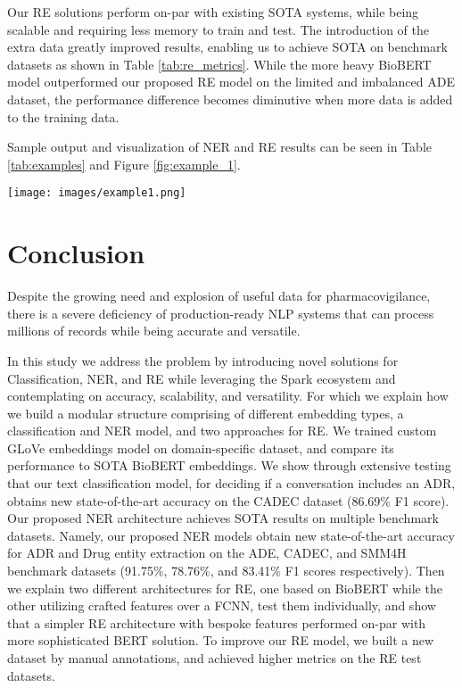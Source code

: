 \documentclass[letterpaper]{article}
\begin{document}
Our RE solutions perform on-par with existing SOTA systems, while being scalable and requiring less memory to train and test. The introduction of the extra data greatly improved results, enabling us to achieve SOTA on benchmark datasets as shown in Table \ref{tab:re_metrics}. While the more heavy BioBERT model outperformed our proposed RE model on the limited and imbalanced ADE dataset, the performance difference becomes diminutive when more data is added to the training data.

Sample output and visualization of NER and RE results can be seen in Table \ref{tab:examples} and Figure \ref{fig:example_1}.

\begin{figure*}[h!]
  \texttt{[image: images/example1.png]}
  \caption{Visualization of Entity Recognition and Relation Extraction results on a sample text. 1 denotes positive relation and 0 denotes negative relation (not related).}
  \label{fig:example_1}
\end{figure*}

\section{Conclusion}
Despite the growing need and explosion of useful data for pharmacovigilance, there is a severe deficiency of production-ready NLP systems that can process millions of records while being accurate and versatile.

In this study we address the problem by introducing novel solutions for Classification, NER, and RE while leveraging the Spark ecosystem and contemplating on accuracy, scalability, and versatility. For which we explain how we build a modular structure comprising of different embedding types, a classification and NER model, and two approaches for RE. We trained custom GLoVe embeddings model on domain-specific dataset, and compare its performance to SOTA BioBERT embeddings. We show through extensive testing that our text classification model, for deciding if a conversation includes an ADR, obtains new state-of-the-art accuracy on the CADEC dataset (86.69\% F1 score). Our proposed NER architecture achieves SOTA results on multiple benchmark datasets. Namely, our proposed NER models obtain new state-of-the-art accuracy for ADR and Drug entity extraction on the ADE, CADEC, and SMM4H benchmark datasets (91.75\%, 78.76\%, and 83.41\% F1 scores respectively). Then we explain two different architectures for RE, one based on BioBERT while the other utilizing crafted features over a FCNN, test them individually, and show that a simpler RE architecture with bespoke features performed on-par with more sophisticated BERT solution. To improve our RE model, we built a new dataset by manual annotations, and achieved higher metrics on the RE test datasets.
\end{document}
